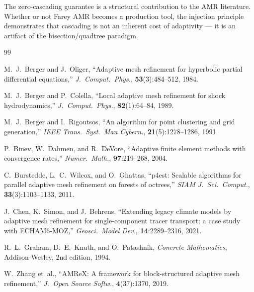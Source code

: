 \documentclass[11pt]{article}
\theoremstyle{definition}
\begin{document}
The zero-cascading guarantee is a structural contribution to the
AMR literature. Whether or not Farey AMR becomes a production tool,
the injection principle demonstrates that cascading is not an
inherent cost of adaptivity --- it is an artifact of the
bisection/quadtree paradigm.


\begin{thebibliography}{99}

M.~J.~Berger and J.~Oliger,
``Adaptive mesh refinement for hyperbolic partial differential
equations,''
\emph{J.\ Comput.\ Phys.}, \textbf{53}(3):484--512, 1984.

M.~J.~Berger and P.~Colella,
``Local adaptive mesh refinement for shock hydrodynamics,''
\emph{J.\ Comput.\ Phys.}, \textbf{82}(1):64--84, 1989.

M.~J.~Berger and I.~Rigoutsos,
``An algorithm for point clustering and grid generation,''
\emph{IEEE Trans.\ Syst.\ Man Cybern.},
\textbf{21}(5):1278--1286, 1991.

P.~Binev, W.~Dahmen, and R.~DeVore,
``Adaptive finite element methods with convergence rates,''
\emph{Numer.\ Math.}, \textbf{97}:219--268, 2004.

C.~Burstedde, L.~C.~Wilcox, and O.~Ghattas,
``p4est: Scalable algorithms for parallel adaptive mesh refinement
on forests of octrees,''
\emph{SIAM J.\ Sci.\ Comput.}, \textbf{33}(3):1103--1133, 2011.

J.~Chen, K.~Simon, and J.~Behrens,
``Extending legacy climate models by adaptive mesh refinement for
single-component tracer transport: a case study with ECHAM6-MOZ,''
\emph{Geosci.\ Model Dev.}, \textbf{14}:2289--2316, 2021.

R.~L.~Graham, D.~E.~Knuth, and O.~Patashnik,
\emph{Concrete Mathematics},
Addison-Wesley, 2nd edition, 1994.

W.~Zhang et~al.,
``AMReX: A framework for block-structured adaptive mesh
refinement,''
\emph{J.\ Open Source Softw.}, \textbf{4}(37):1370, 2019.

\end{thebibliography}
\end{document}
